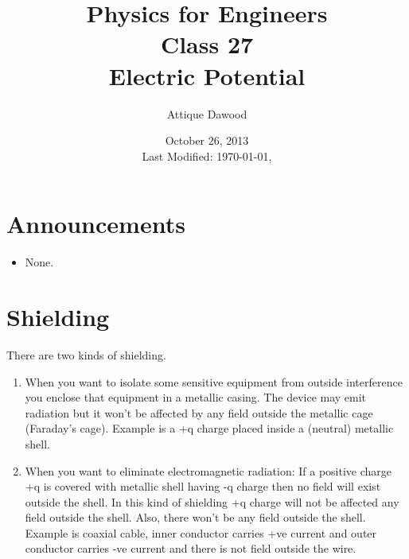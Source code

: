 \documentclass[12pt,a4paper]{article}
\title{\vspace{-3cm}Physics for Engineers\\Class 27\\Electric Potential}
\author{Attique Dawood}
\date{October 26, 2013\\[0.2cm] Last Modified: \today, \currenttime}
\begin{document}
\maketitle
\section{Announcements}
\begin{itemize}
\item None.
\end{itemize}
\section{Shielding}
There are two kinds of shielding.
\begin{enumerate}
\item When you want to isolate some sensitive equipment from outside interference you enclose that equipment in a metallic casing. The device may emit radiation but it won't be affected by any field outside the metallic cage (Faraday's cage). Example is a +q charge placed inside a (neutral) metallic shell.
\item When you want to eliminate electromagnetic radiation: If a positive charge +q is covered with metallic shell having -q charge then no field will exist outside the shell. In this kind of shielding +q charge will not be affected any field outside the shell. Also, there won't be any field outside the shell. Example is coaxial cable, inner conductor carries +ve current and outer conductor carries -ve current and there is not field outside the wire.
\end{enumerate}
\end{document}
